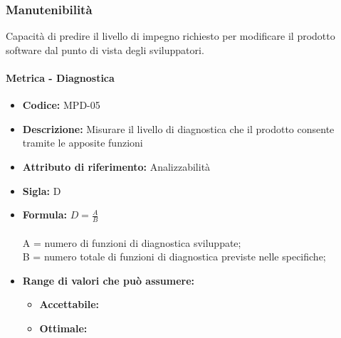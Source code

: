      
      
      
        \subsubsection{Manutenibilità} 
    Capacità di predire il livello di impegno richiesto per modificare il prodotto software dal punto di vista degli sviluppatori.
    
        \paragraph{Metrica - Diagnostica} 
           \begin{itemize}
          \item  \textbf{Codice:} MPD-05
          \item  \textbf{Descrizione:} Misurare il livello di diagnostica che il prodotto consente tramite le apposite funzioni 
          \item  \textbf{Attributo di riferimento:} Analizzabilità
         \item   \textbf{Sigla:} D
          \item  \textbf{Formula:} \begin{math}D = \frac{A}{B}\end{math}\\ \\
            A = numero di funzioni di diagnostica sviluppate;\\
            B = numero totale di funzioni di diagnostica previste nelle specifiche;
                 \item \textbf{Range di valori che può assumere:}
        \begin{itemize}
            \item \textbf{Accettabile:} 
            \item \textbf{Ottimale:} 
        \end{itemize}
       \end{itemize}
              
           
